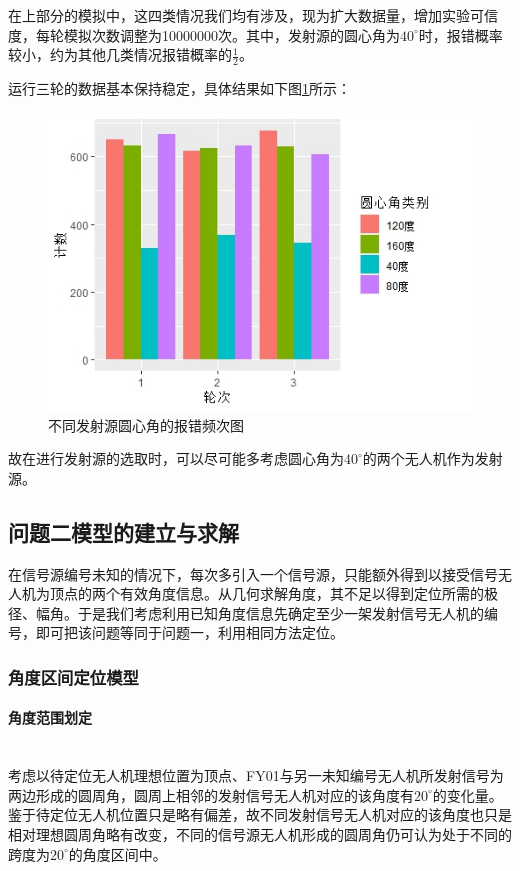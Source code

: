 \documentclass{ctexart}
\newcommand{\subsubsubsection}[1]{\paragraph{#1}\mbox{}\\}
\begin{document}
在上部分的模拟中，这四类情况我们均有涉及，现为扩大数据量，增加实验可信度，每轮模拟次数调整为10000000次。其中，发射源的圆心角为$40^{\circ}$时，报错概率较小，约为其他几类情况报错概率的$\frac{1}{2}$。

运行三轮的数据基本保持稳定，具体结果如下图\ref{不同发射源圆心角的报错频次图}所示：

\begin{figure}[htbp]
  \centering
  \includegraphics[width=0.75\linewidth]{pic/Rplot01.jpeg}
  \caption{不同发射源圆心角的报错频次图}
  \label{不同发射源圆心角的报错频次图}
  \end{figure}




故在进行发射源的选取时，可以尽可能多考虑圆心角为$40^{\circ}$的两个无人机作为发射源。


\subsection{问题二模型的建立与求解}

在信号源编号未知的情况下，每次多引入一个信号源，只能额外得到以接受信号无人机为顶点的两个有效角度信息。从几何求解角度，其不足以得到定位所需的极径、幅角。于是我们考虑利用已知角度信息先确定至少一架发射信号无人机的编号，即可把该问题等同于问题一，利用相同方法定位。

\subsubsection{角度区间定位模型}

\subsubsubsection{角度范围划定}
考虑以待定位无人机理想位置为顶点、FY01与另一未知编号无人机所发射信号为两边形成的圆周角，圆周上相邻的发射信号无人机对应的该角度有$20^{\circ}$的变化量。鉴于待定位无人机位置只是略有偏差，故不同发射信号无人机对应的该角度也只是相对理想圆周角略有改变，不同的信号源无人机形成的圆周角仍可认为处于不同的跨度为$20^{\circ}$的角度区间中。
\end{document}
